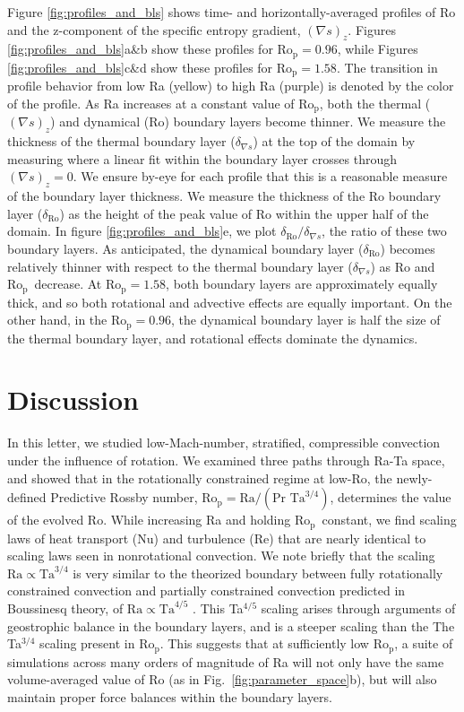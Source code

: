 \documentclass[twocolumn, amsmath, amsfonts, amssymb]{aastex62}
\newcommand{\grad}{\ensuremath{\nabla}}
\newcommand{\pro}{\ensuremath{\text{Ro}_{\text{p}}}}
\begin{document}
Figure \ref{fig:profiles_and_bls} shows time- and horizontally-averaged profiles of
Ro and the z-component of the specific entropy gradient, $(\grad s)_z$.
Figures \ref{fig:profiles_and_bls}a\&b show these profiles for $\pro=0.96$, while
Figures \ref{fig:profiles_and_bls}c\&d show these profiles for $\pro=1.58$. The transition
in profile behavior from low Ra (yellow) to high Ra (purple) is denoted by the color of the
profile.
As Ra increases at a constant value of
\pro, both the thermal ($(\grad s)_z$) and dynamical (Ro) boundary layers become thinner. 
We measure the
thickness of the thermal boundary layer ($\delta_{\grad s}$) at the top of the domain by 
measuring where a linear fit within the boundary layer crosses through $(\grad s)_z = 0$.
We ensure by-eye for each profile that this is a reasonable measure of the boundary
layer thickness. We measure
the thickness of the Ro boundary layer ($\delta_{\text{Ro}}$) 
as the height of the peak value of Ro within the
upper half of the domain.
In figure \ref{fig:profiles_and_bls}e, we plot $\delta_{\text{Ro}}/\delta_{\grad s}$, the ratio
of these two boundary layers. As anticipated, the dynamical boundary layer ($\delta_{\text{Ro}}$)
becomes relatively thinner with respect to the thermal boundary layer ($\delta_{\grad s}$)
as Ro and \pro$\,$ decrease. At $\pro = 1.58$, both boundary layers are approximately equally
thick, and so both rotational and advective effects are equally important. On the other hand,
in the $\pro = 0.96$, the dynamical boundary layer is half the size of the thermal boundary
layer, and rotational effects dominate the dynamics.

\newpage
\section{Discussion}
\label{sec:discussion}
In this letter, we studied low-Mach-number, stratified, compressible convection 
under the influence of rotation.
We examined three paths through Ra-Ta space, and showed that in the rotationally
constrained regime at low-Ro, the newly-defined 
Predictive Rossby number, $\pro = \text{Ra}/(\text{Pr }\text{Ta}^{3/4})$, determines the value of
the evolved Ro. While increasing Ra and holding \pro$\,$ constant,
we find scaling laws of heat transport (Nu) and turbulence (Re) that are nearly identical
to scaling laws seen in nonrotational convection.
We note briefly that the scaling $\text{Ra} \propto \text{Ta}^{3/4}$ is very similar to
the theorized boundary between fully rotationally constrained convection and 
partially constrained convection predicted in Boussinesq theory, of 
$\text{Ra} \propto \text{Ta}^{4/5}$ \citep{julien&all2012, gastine&all2016}. This
Ta$^{4/5}$ scaling arises through arguments of geostrophic balance in the boundary layers,
and is a steeper scaling than the The Ta$^{3/4}$ scaling present in \pro.
This suggests that at sufficiently low \pro, a suite of simulations across many orders
of magnitude of Ra will not only have the same volume-averaged value of Ro 
(as in Fig.~\ref{fig:parameter_space}b), but will
also maintain proper force balances within the boundary layers.
\end{document}
